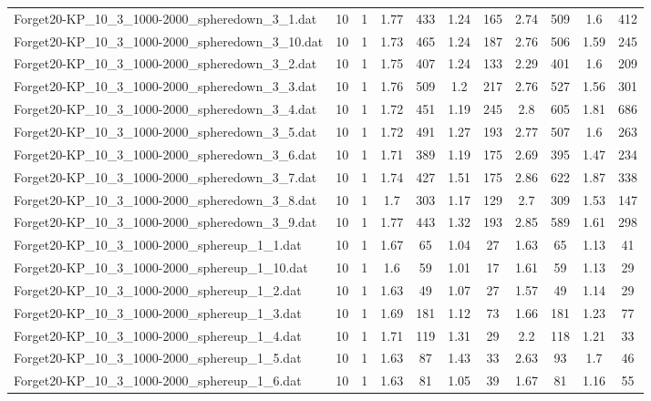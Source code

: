 \begin{table}[!ht]
\begin{tabular}{lcccccccccc}
Forget20-KP\_10\_3\_1000-2000\_spheredown\_3\_1.dat & 10 & 1 & 1.77 & 433 & 1.24 & 165 & 2.74 & 509 & 1.6 & 412 \\
Forget20-KP\_10\_3\_1000-2000\_spheredown\_3\_10.dat & 10 & 1 & 1.73 & 465 & 1.24 & 187 & 2.76 & 506 & 1.59 & 245 \\
Forget20-KP\_10\_3\_1000-2000\_spheredown\_3\_2.dat & 10 & 1 & 1.75 & 407 & 1.24 & 133 & 2.29 & 401 & 1.6 & 209 \\
Forget20-KP\_10\_3\_1000-2000\_spheredown\_3\_3.dat & 10 & 1 & 1.76 & 509 & 1.2 & 217 & 2.76 & 527 & 1.56 & 301 \\
Forget20-KP\_10\_3\_1000-2000\_spheredown\_3\_4.dat & 10 & 1 & 1.72 & 451 & 1.19 & 245 & 2.8 & 605 & 1.81 & 686 \\
Forget20-KP\_10\_3\_1000-2000\_spheredown\_3\_5.dat & 10 & 1 & 1.72 & 491 & 1.27 & 193 & 2.77 & 507 & 1.6 & 263 \\
Forget20-KP\_10\_3\_1000-2000\_spheredown\_3\_6.dat & 10 & 1 & 1.71 & 389 & 1.19 & 175 & 2.69 & 395 & 1.47 & 234 \\
Forget20-KP\_10\_3\_1000-2000\_spheredown\_3\_7.dat & 10 & 1 & 1.74 & 427 & 1.51 & 175 & 2.86 & 622 & 1.87 & 338 \\
Forget20-KP\_10\_3\_1000-2000\_spheredown\_3\_8.dat & 10 & 1 & 1.7 & 303 & 1.17 & 129 & 2.7 & 309 & 1.53 & 147 \\
Forget20-KP\_10\_3\_1000-2000\_spheredown\_3\_9.dat & 10 & 1 & 1.77 & 443 & 1.32 & 193 & 2.85 & 589 & 1.61 & 298 \\
Forget20-KP\_10\_3\_1000-2000\_sphereup\_1\_1.dat & 10 & 1 & 1.67 & 65 & 1.04 & 27 & 1.63 & 65 & 1.13 & 41 \\
Forget20-KP\_10\_3\_1000-2000\_sphereup\_1\_10.dat & 10 & 1 & 1.6 & 59 & 1.01 & 17 & 1.61 & 59 & 1.13 & 29 \\
Forget20-KP\_10\_3\_1000-2000\_sphereup\_1\_2.dat & 10 & 1 & 1.63 & 49 & 1.07 & 27 & 1.57 & 49 & 1.14 & 29 \\
Forget20-KP\_10\_3\_1000-2000\_sphereup\_1\_3.dat & 10 & 1 & 1.69 & 181 & 1.12 & 73 & 1.66 & 181 & 1.23 & 77 \\
Forget20-KP\_10\_3\_1000-2000\_sphereup\_1\_4.dat & 10 & 1 & 1.71 & 119 & 1.31 & 29 & 2.2 & 118 & 1.21 & 33 \\
Forget20-KP\_10\_3\_1000-2000\_sphereup\_1\_5.dat & 10 & 1 & 1.63 & 87 & 1.43 & 33 & 2.63 & 93 & 1.7 & 46 \\
Forget20-KP\_10\_3\_1000-2000\_sphereup\_1\_6.dat & 10 & 1 & 1.63 & 81 & 1.05 & 39 & 1.67 & 81 & 1.16 & 55 \\

\end{tabular}
\end{table}
